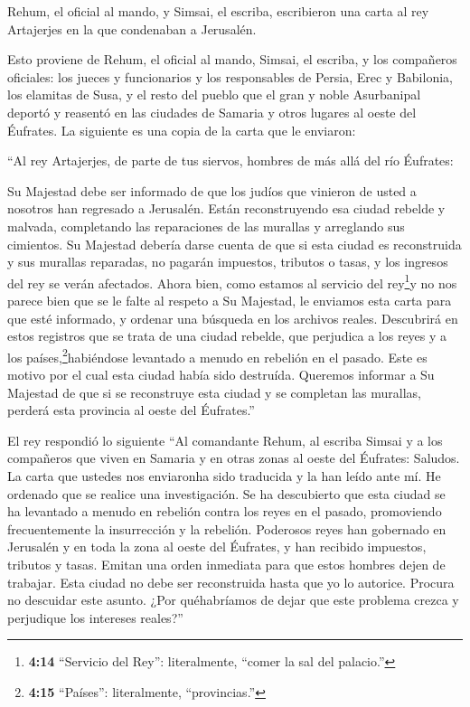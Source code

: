  Rehum, el oficial al mando, y Simsai, el escriba,
escribieron una carta al rey Artajerjes en la que condenaban a
Jerusalén.

 Esto proviene de Rehum, el oficial al mando, Simsai, el
escriba, y los compañeros oficiales: los jueces y funcionarios y los
responsables de Persia, Erec y Babilonia, los elamitas de Susa,
 y el resto del pueblo que el gran y noble Asurbanipal
deportó y reasentó en las ciudades de Samaria y otros lugares al oeste
del Éufrates.  La siguiente es una copia de la carta que le
enviaron:

``Al rey Artajerjes, de parte de tus siervos, hombres de más allá del
río Éufrates:

 Su Majestad debe ser informado de que los judíos que
vinieron de usted a nosotros han regresado a Jerusalén. Están
reconstruyendo esa ciudad rebelde y malvada, completando las
reparaciones de las murallas y arreglando sus cimientos. 
Su Majestad debería darse cuenta de que si esta ciudad es reconstruida y
sus murallas reparadas, no pagarán impuestos, tributos o tasas, y los
ingresos del rey se verán afectados.  Ahora bien, como
estamos al servicio del rey\footnote{\textbf{4:14} ``Servicio del Rey'':
  literalmente, ``comer la sal del palacio.''}y no nos parece bien que
se le falte al respeto a Su Majestad, le enviamos esta carta para que
esté informado,  y ordenar una búsqueda en los archivos
reales. Descubrirá en estos registros que se trata de una ciudad
rebelde, que perjudica a los reyes y a los países,\footnote{\textbf{4:15}
  ``Países'': literalmente, ``provincias.''}habiéndose levantado a
menudo en rebelión en el pasado. Este es motivo por el cual esta ciudad
había sido destruída.  Queremos informar a Su Majestad de
que si se reconstruye esta ciudad y se completan las murallas, perderá
esta provincia al oeste del Éufrates.''

 El rey respondió lo siguiente ``Al comandante Rehum, al
escriba Simsai y a los compañeros que viven en Samaria y en otras zonas
al oeste del Éufrates: Saludos.  La carta que ustedes nos
enviaronha sido traducida y la han leído ante mí.  He
ordenado que se realice una investigación. Se ha descubierto que esta
ciudad se ha levantado a menudo en rebelión contra los reyes en el
pasado, promoviendo frecuentemente la insurrección y la rebelión.
 Poderosos reyes han gobernado en Jerusalén y en toda la
zona al oeste del Éufrates, y han recibido impuestos, tributos y tasas.
 Emitan una orden inmediata para que estos hombres dejen de
trabajar. Esta ciudad no debe ser reconstruida hasta que yo lo autorice.
 Procura no descuidar este asunto. ¿Por quéhabríamos de
dejar que este problema crezca y perjudique los intereses reales?''


